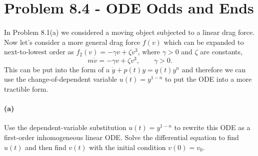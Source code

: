 \documentclass{article}
\begin{document}
\bigskip
\dphline
\pagebreak
\section*{Problem 8.4 - ODE Odds and Ends}

\paragraph{}
In Problem 8.1(a) we considered a moving object subjected to a linear drag force.  Now let's consider a more general drag force $f(v)$ which can be expanded to next-to-lowest 
order as $f_{2}(v) = -\gamma v + \zeta v^{3}$, where $\gamma>0$ and $\zeta$ are constants,
	\begin{equation*}
		m\dot{v} = -\gamma v + \zeta v^{3},	\qquad \gamma >0.
	\end{equation*}
This can be put into the form of a  $\dot{y} + p(t)y = q(t)y^{n}$ and therefore we can use the change-of-dependent variable
$u(t)=y^{1-n}$ to put the ODE into a more tractible form.

\paragraph{(a)}
Use the dependent-variable substitution $u(t) = y^{1-n}$ to rewrite this ODE as a first-order inhomogeneous linear ODE.
Solve the differential equation to find $u(t)$ and then find $v(t)$ with the initial condition $v(0) = v_{0}$.
\end{document}
